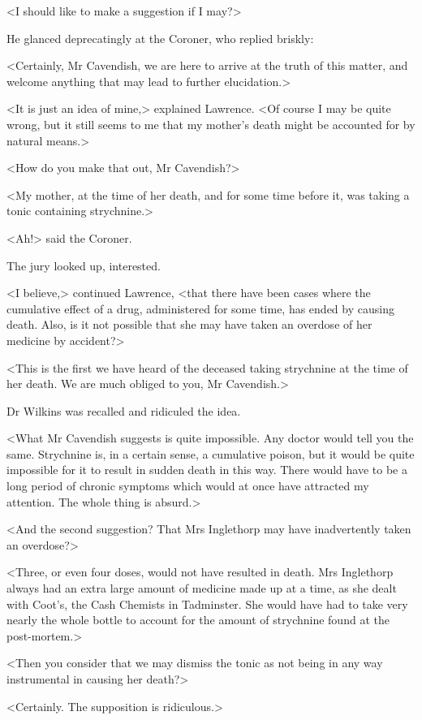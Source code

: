  <I should like to make a suggestion if I may?> 

 He glanced deprecatingly at the Coroner, who replied briskly: 

 <Certainly, Mr Cavendish, we are here to arrive at the truth of this matter, and welcome anything that may lead to further elucidation.> 

 <It is just an idea of mine,> explained Lawrence. <Of course I may be quite wrong, but it still seems to me that my mother's death might be accounted for by natural means.> 

 <How do you make that out, Mr Cavendish?> 

 <My mother, at the time of her death, and for some time before it, was taking a tonic containing strychnine.> 

 <Ah!> said the Coroner. 

 The jury looked up, interested. 

 <I believe,> continued Lawrence, <that there have been cases where the cumulative effect of a drug, administered for some time, has ended by causing death. Also, is it not possible that she may have taken an overdose of her medicine by accident?> 

 <This is the first we have heard of the deceased taking strychnine at the time of her death. We are much obliged to you, Mr Cavendish.> 

 Dr Wilkins was recalled and ridiculed the idea. 

 <What Mr Cavendish suggests is quite impossible. Any doctor would tell you the same. Strychnine is, in a certain sense, a cumulative poison, but it would be quite impossible for it to result in sudden death in this way. There would have to be a long period of chronic symptoms which would at once have attracted my attention. The whole thing is absurd.> 

 <And the second suggestion? That Mrs Inglethorp may have inadvertently taken an overdose?> 

 <Three, or even four doses, would not have resulted in death. Mrs Inglethorp always had an extra large amount of medicine made up at a time, as she dealt with Coot's, the Cash Chemists in Tadminster. She would have had to take very nearly the whole bottle to account for the amount of strychnine found at the post-mortem.> 

 <Then you consider that we may dismiss the tonic as not being in any way instrumental in causing her death?> 

 <Certainly. The supposition is ridiculous.> 

